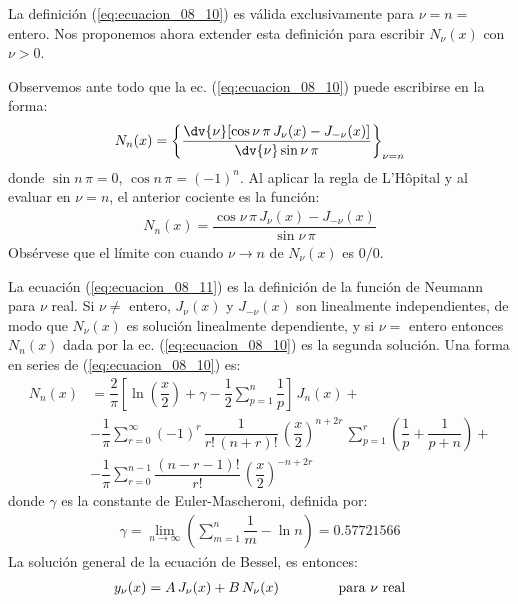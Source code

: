 \par
La definición (\ref{eq:ecuacion_08_10}) es válida exclusivamente para $\nu = n =$ entero. Nos proponemos ahora extender esta definición para escribir $N_{\nu} (x)$ con $\nu > 0$.
\par
Observemos ante todo que la ec. (\ref{eq:ecuacion_08_10}) puede escribirse en la forma:
\begin{align*}
N_{n} (x) =  \left\{ \dfrac{\displaystyle \dv{{\nu}} [\cos \nu \, \pi \, J_{\nu} (x) - J_{-\nu} (x)]}{\displaystyle \dv{\nu} \sin \nu \, \pi} \right\}_{\nu=n}
\end{align*}
donde $\sin n \, \pi = 0$, $\cos n \, \pi = (-1)^{n}$. Al aplicar la regla de L'Hôpital y al evaluar en $\nu = n$, el anterior cociente es la función:
\begin{align}
N_{n} (x) = \dfrac{\cos \nu \, \pi \, J_{\nu} (x) - J_{-\nu} (x)}{\sin \nu \, \pi}
\label{eq:ecuacion_08_11}
\end{align}
Obsérvese que el límite con cuando $\nu \to n$ de $N_{\nu} (x)$ es $0/0$.
\par
La ecuación (\ref{eq:ecuacion_08_11}) es la definición de la función de Neumann para $\nu$ real. Si $\nu \neq$ entero, $J_{\nu} (x)$ y $J_{-\nu} (x)$ son linealmente independientes, de modo que $N_{\nu}(x)$ es solución linealmente dependiente, y si $\nu =$ entero entonces $N_{n}(x)$ dada por la ec. (\ref{eq:ecuacion_08_10}) es la segunda solución. Una forma en series de (\ref{eq:ecuacion_08_10}) es:
\begin{align*}
N_{n}(x) &= \dfrac{2}{\pi} \left[ \ln \left(\dfrac{x}{2} \right) + \gamma - \dfrac{1}{2} \sum_{p=1}^{n} \dfrac{1}{p} \right] \, J_{n} (x) + \\[0.5em]
&- \dfrac{1}{\pi} \sum_{r=0}^{\infty} (-1)^{r} \, \dfrac{1}{r! \, (n + r)!} \, \left( \dfrac{x}{2} \right)^{n+2r} \, \sum_{p=1}^{r} \left( \dfrac{1}{p} + \dfrac{1}{p + n} \right) + \\[0.5em]
&- \dfrac{1}{\pi} \sum_{r=0}^{n-1} \dfrac{(n - r - 1)!}{r!} \, \left( \dfrac{x}{2} \right)^{-n+2r}
\end{align*}
donde $\gamma$ es la constante de Euler-Mascheroni, definida por:
\begin{align*}
\gamma = \lim_{n \to \infty} \left( \sum_{m=1}^{n} \dfrac{1}{m} - \ln n \right) = 0.57721566
\end{align*}
La solución general de la ecuación de Bessel, es entonces:
\begin{align*}
y_{\nu} (x) = A \, J_{\nu} (x) + B \, N_{\nu} (x) \hspace{1.5cm} \mbox{para $\nu$ real}
\end{align*}
